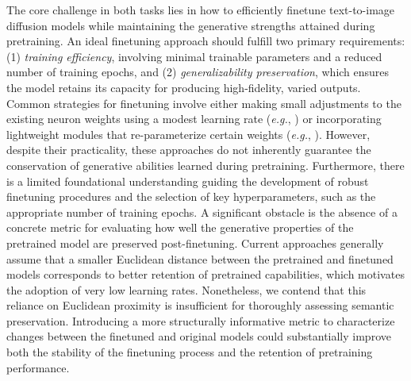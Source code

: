 The core challenge in both tasks lies in how to efficiently finetune text-to-image diffusion models while maintaining the generative strengths attained during pretraining. An ideal finetuning approach should fulfill two primary requirements: (1) \emph{training efficiency}, involving minimal trainable parameters and a reduced number of training epochs, and (2) \emph{generalizability preservation}, which ensures the model retains its capacity for producing high-fidelity, varied outputs. Common strategies for finetuning involve either making small adjustments to the existing neuron weights using a modest learning rate (\emph{e.g.}, \cite{ruiz2023dreambooth}) or incorporating lightweight modules that re-parameterize certain weights (\emph{e.g.}, \cite{hulora2022,zhang2023adding}). However, despite their practicality, these approaches do not inherently guarantee the conservation of generative abilities learned during pretraining. Furthermore, there is a limited foundational understanding guiding the development of robust finetuning procedures and the selection of key hyperparameters, such as the appropriate number of training epochs. A significant obstacle is the absence of a concrete metric for evaluating how well the generative properties of the pretrained model are preserved post-finetuning. Current approaches generally assume that a smaller Euclidean distance between the pretrained and finetuned models corresponds to better retention of pretrained capabilities, which motivates the adoption of very low learning rates. Nonetheless, we contend that this reliance on Euclidean proximity is insufficient for thoroughly assessing semantic preservation. Introducing a more structurally informative metric to characterize changes between the finetuned and original models could substantially improve both the stability of the finetuning process and the retention of pretraining performance.

